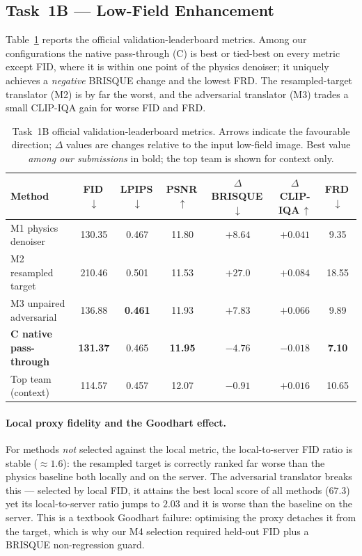 \documentclass[runningheads]{llncs}
\begin{document}
\subsection{Task~1B --- Low-Field Enhancement}
\label{sec:r1b}

Table~\ref{tab:board} reports the official validation-leaderboard metrics.
Among our configurations the native pass-through (C) is best or tied-best on
every metric except FID, where it is within one point of the physics denoiser; it
uniquely achieves a \emph{negative} BRISQUE change and the lowest FRD. The
resampled-target translator (M2) is by far the worst, and the adversarial
translator (M3) trades a small CLIP-IQA gain for worse FID and FRD.

\begin{table}[htbp]
\caption{Task~1B official validation-leaderboard metrics. Arrows indicate the
favourable direction; $\Delta$ values are changes relative to the input low-field
image. Best value \emph{among our submissions} in bold; the top team is shown for
context only.}
\label{tab:board}
\centering
\small
\begin{tabular}{lcccccc}
\toprule
Method & FID\,$\downarrow$ & LPIPS\,$\downarrow$ & PSNR\,$\uparrow$ &
$\Delta$BRISQUE\,$\downarrow$ & $\Delta$CLIP-IQA\,$\uparrow$ & FRD\,$\downarrow$ \\
\midrule
M1 physics denoiser        & 130.35 & 0.467 & 11.80 & $+8.64$ & $+0.041$ & 9.35 \\
M2 resampled target        & 210.46 & 0.501 & 11.53 & $+27.0$ & $+0.084$ & 18.55 \\
M3 unpaired adversarial    & 136.88 & \textbf{0.461} & 11.93 & $+7.83$ & \textbf{$+0.066$} & 9.89 \\
\textbf{C native pass-through} & \textbf{131.37} & 0.465 & \textbf{11.95} &
\textbf{$-4.76$} & $-0.018$ & \textbf{7.10} \\
\midrule
Top team (context)         & 114.57 & 0.457 & 12.07 & $-0.91$ & $+0.016$ & 10.65 \\
\bottomrule
\end{tabular}
\end{table}

\paragraph{Local proxy fidelity and the Goodhart effect.}
For methods \emph{not} selected against the local metric, the local-to-server FID
ratio is stable ($\approx1.6$): the resampled target is correctly ranked far
worse than the physics baseline both locally and on the server. The adversarial
translator breaks this --- selected by local FID, it attains the best local score
of all methods ($67.3$) yet its local-to-server ratio jumps to $2.03$ and it is
worse than the baseline on the server. This is a textbook Goodhart failure:
optimising the proxy detaches it from the target, which is why our M4 selection
required held-out FID plus a BRISQUE non-regression guard.
\end{document}
